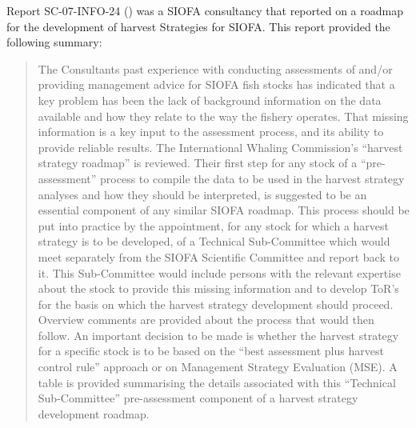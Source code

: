 Report SC-07-INFO-24 (\cite{butterworth_development_2022}) was a SIOFA consultancy that reported on a roadmap for the development of harvest Strategies for SIOFA. This report provided the following summary:
\begin{quote}
The Consultants past experience with conducting assessments of and/or providing management advice for SIOFA fish stocks has indicated that a key problem has been the lack of background information on the data available and how they relate to the way the fishery operates. That missing information is a key input to the assessment process, and its ability to provide reliable results. The International Whaling Commission’s “harvest strategy roadmap” is reviewed. Their first step for any stock of a “pre-assessment” process to compile the data to be used in the harvest strategy analyses and how they should be interpreted, is suggested to be an essential component of any similar SIOFA roadmap. This process should be put into practice by the appointment, for any stock for which a harvest strategy is to be developed, of a Technical Sub-Committee which would meet separately from the SIOFA Scientific Committee and report back to it. This Sub-Committee would include persons with the relevant expertise about the stock to provide this missing information and to develop ToR’s for the basis on which the harvest strategy development should proceed. Overview comments are provided about the process that would then follow. An important decision to be made is whether the harvest strategy for a specific stock is to be based on the “best assessment plus harvest control rule” approach or on Management Strategy Evaluation (MSE). A table is provided summarising the details associated with this “Technical Sub-Committee” pre-assessment component of a harvest strategy development roadmap.
\end{quote}

